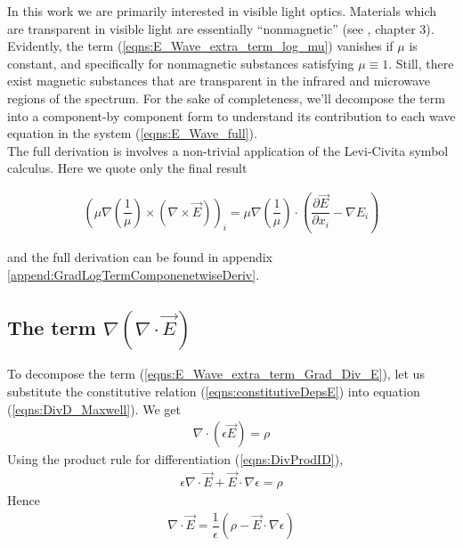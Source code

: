 \documentclass[12pt,twoside]{report}
\begin{document}
In this work we are primarily interested in visible light optics. Materials which are transparent in visible light are essentially ``nonmagnetic'' (see \cite{Hecht2002}, chapter 3). Evidently, the term (\ref{eqns:E_Wave_extra_term_log_mu}) vanishes if $\mu$ is constant, and specifically for nonmagnetic substances satisfying $\mu \equiv 1$. Still, there exist magnetic substances that are transparent in the infrared and microwave regions of the spectrum. For the sake of completeness, we'll decompose the term into a component-by component form to understand its contribution to each wave equation in  the system (\ref{eqns:E_Wave_full}).\\
The full derivation is involves a non-trivial application of the Levi-Civita symbol calculus. Here we quote only the final result

\begin{align}
\label{eqns:E_Wave_extra_term_log_mu_expanded}
\left(\mu \nabla \left( \dfrac{1}{\mu}\right) \times \left(\nabla \times \overrightarrow{E} \right) \right)_i = 
\mu \nabla \left(\dfrac{1}{\mu} \right) \cdot \left( \dfrac{\partial \overrightarrow{E}}{\partial x_i}- \nabla E_i \right)
\end{align}

and the full derivation can be found in appendix \ref{append:GradLogTermComponenetwiseDeriv}.






\subsection{The term $\nabla (\nabla \cdot \vec{E})$}
To decompose the term (\ref{eqns:E_Wave_extra_term_Grad_Div_E}), let us substitute the constitutive relation (\ref{eqns:constitutiveDepsE}) into equation (\ref{eqns:DivD_Maxwell}). We get
\begin{align*}
\nabla \cdot (\epsilon \overrightarrow{E}) = \rho
\end{align*}
Using the product rule for differentiation (\ref{eqns:DivProdID}), 
\begin{align*}
\epsilon\nabla \cdot \overrightarrow{E} + \overrightarrow{E} \cdot \nabla \epsilon = \rho
\end{align*}
Hence
\begin{align}
\label{eqns:DivE}
\nabla \cdot \overrightarrow{E} =\dfrac{1}{\epsilon} \left(\rho - \overrightarrow{E} \cdot \nabla \epsilon\right)
\end{align}
\end{document}
